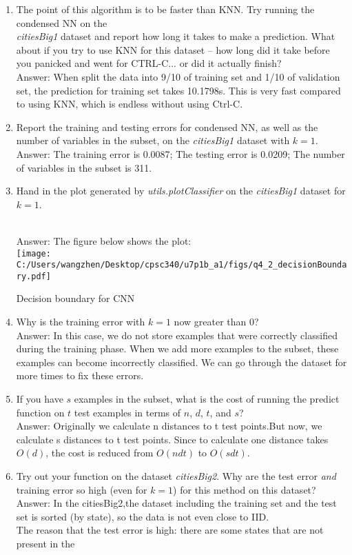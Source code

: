 \documentclass{article}
\def\blu#1{{\color{blu}#1}}
\def\enum#1{\begin{enumerate}#1\end{enumerate}}
\begin{document}
\blu{
\enum{
\item The point of this algorithm is to be faster than KNN. Try running the condensed NN on the\\\emph{citiesBig1} dataset and report how long it takes to make a prediction. What about if you try to use KNN for this dataset -- how long did it take before you panicked and went for CTRL-C... or did it actually finish?
\textcolor{gre}{\\Answer: When split the data into 9/10 of training set and 1/10 of validation set, the prediction for training set takes 10.1798s. This is very fast compared to using KNN, which is endless without using Ctrl-C.}
\item Report the training and testing errors for condensed NN, as well as the number of variables in the subset, on the \emph{citiesBig1} dataset with $k=1$.
\textcolor{gre}{\\Answer: The training error is 0.0087; The testing error is 0.0209; The number of variables in the subset is 311.}
\item Hand in the plot generated by \emph{utils.plotClassifier} on the \emph{citiesBig1} dataset for $k=1$.
\textcolor{gre}{\\Answer: The figure below shows the plot:\\ \texttt{[image: C:/Users/wangzhen/Desktop/cpsc340/u7p1b\_a1/figs/q4\_2\_decisionBoundary.pdf]}
\caption{Decision boundary for CNN}}
\item Why is the training error with $k=1$ now greater than $0$?
\textcolor{gre}{\\Answer: In this case, we do not store examples that were correctly classified during the training phase. When we add more examples to the subset, these examples can become incorrectly classified. We can go through the dataset for more times to fix these errors.}
\item If you have $s$ examples in the subset, what is the cost of running the predict function on $t$ test examples in terms of $n$, $d$, $t$, and $s$?
\textcolor{gre}{\\Answer: Originally we calculate n distances to t test points.But now, we calculate s distances to t test points. Since to calculate one distance takes $O(d)$, the cost is reduced from $O(ndt)$ to $O(sdt)$.}
\item Try out your function on the dataset \emph{citiesBig2}. Why are the  test error \emph{and} training error so high (even for $k=1$) for this method on this dataset?
\textcolor{gre}{\\Answer: In the citiesBig2,the dataset including the training set and the test set is sorted (by state), so the data is not even close to IID. \\The reason that the test error is high: there are some states that are not present in the
}}}
\end{document}
